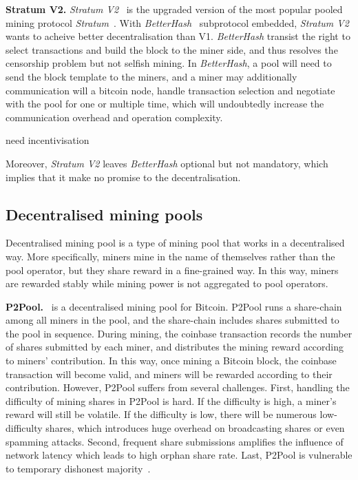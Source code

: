 \textbf{Stratum V2.}
\textit{Stratum V2}~\cite{stratum-v2} is the upgraded version of the most popular pooled mining protocol \textit{Stratum}~\cite{stratum}.
With \textit{BetterHash}~\cite{draft-bip-BetterHash} subprotocol embedded, \textit{Stratum V2} wants to acheive better decentralisation than V1.
\textit{BetterHash} transist the right to select transactions and build the block to the miner side, and thus resolves the censorship problem but not selfish mining.
In \textit{BetterHash}, a pool will need to send the block template to 
the miners, and a miner may additionally
communication will a bitcoin node, 
handle transaction selection 
and negotiate with the pool for one or multiple time,
which will undoubtedly increase the communication overhead and operation complexity.


need incentivisation



Moreover, \textit{Stratum V2} leaves \textit{BetterHash} optional but not mandatory, which implies that it make no promise to the decentralisation.


\subsection{Decentralised mining pools}



Decentralised mining pool is a type of mining pool that works in a decentralised way.
More specifically, miners mine in the name of themselves rather than the pool operator, but they share reward in a fine-grained way.
In this way, miners are rewarded stably while mining power is not aggregated to pool operators.



\textbf{P2Pool.}~\cite{voight2011p2pool} is a decentralised mining pool for Bitcoin.
P2Pool runs a share-chain among all miners in the pool, and the share-chain includes shares submitted to the pool in sequence.
During mining, the coinbase transaction records the number of shares submitted by each miner, and distributes the mining reward according to miners' contribution.
In this way, once mining a Bitcoin block, the coinbase transaction will become valid, and miners will be rewarded according to their contribution.
However, P2Pool suffers from several challenges.
First, handling the difficulty of mining shares in P2Pool is hard.
If the difficulty is high, a miner's reward will still be volatile.
If the difficulty is low, there will be numerous low-difficulty shares, which introduces huge overhead on broadcasting shares or even spamming attacks.
Second, frequent share submissions amplifies the influence of network latency which leads to high orphan share rate.
Last, P2Pool is vulnerable to temporary dishonest majority~\cite{decentralised-mining-pool-security}.

